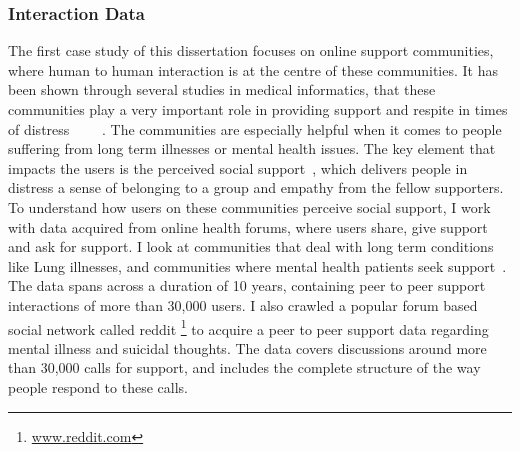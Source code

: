 \subsubsection{Interaction Data}
The first case study of this dissertation focuses on online support communities, where human to human interaction is at the centre of these communities. It has been shown through several studies in medical informatics, that these communities play a very important role in providing support and respite in times of distress~\cite{allen2016long}~\cite{mo2012developing,pendry2015individual} ~\cite{bartlett2011investigation,izuka2017stroke}~\cite{hobbs2016online}. The communities are especially helpful when it comes to people suffering from long term illnesses or mental health issues.
The key element that impacts the users is the perceived social support~\cite{nambisan2011information}, which delivers people in distress a sense of belonging to a group and empathy from the fellow supporters. 
To understand how users on these communities perceive social support, I work with data acquired from online health forums, where users share, give support and ask for support. I look at communities that deal with long term conditions like Lung illnesses, and communities where mental health patients seek support~\cite{joglekar2018online}. The data spans across a duration of 10 years, containing peer to peer support interactions of more than 30,000 users. I also crawled a popular forum based social network called reddit \footnote{\url{www.reddit.com}} to acquire a peer to peer support data regarding mental illness and suicidal thoughts. The data covers discussions around  more than 30,000 calls for support, and includes the complete structure of the way people respond to these calls. 

